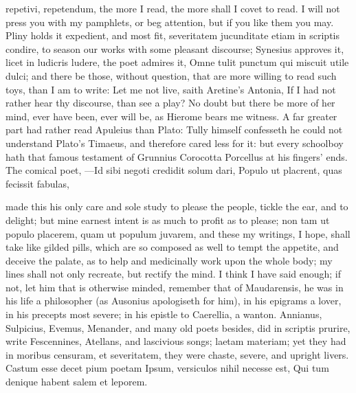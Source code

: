 {repetivi, repetendum, the more I read, the more shall I covet to read.
I will not press you with my pamphlets, or beg attention, but if you
like them you may. Pliny holds it expedient, and most fit, severitatem
jucunditate etiam in scriptis condire, to season our works with some
pleasant discourse; Synesius approves it, licet in ludicris ludere, the
poet admires it, Omne tulit punctum qui miscuit utile dulci; and
there be those, without question, that are more willing to read such
toys, than I am to write: Let me not live, saith Aretine's
Antonia, If I had not rather hear thy discourse, than see a play?
No doubt but there be more of her mind, ever have been, ever will be,
as Hierome bears me witness. A far greater part had rather read
Apuleius than Plato: Tully himself confesseth he could not understand
Plato's Timaeus, and therefore cared less for it: but every schoolboy
hath that famous testament of Grunnius Corocotta Porcellus at his
fingers' ends. The comical poet,
---Id sibi negoti credidit solum dari,
Populo ut placrent, quas fecissit fabulas,

made this his only care and sole study to please the people, tickle the
ear, and to delight; but mine earnest intent is as much to profit as to
please; non tam ut populo placerem, quam ut populum juvarem, and these
my writings, I hope, shall take like gilded pills, which are so
composed as well to tempt the appetite, and deceive the palate, as to
help and medicinally work upon the whole body; my lines shall not only
recreate, but rectify the mind. I think I have said enough; if not, let
him that is otherwise minded, remember that of Maudarensis, he
was in his life a philosopher (as Ausonius apologiseth for him), in his
epigrams a lover, in his precepts most severe; in his epistle to
Caerellia, a wanton. Annianus, Sulpicius, Evemus, Menander, and many
old poets besides, did in scriptis prurire, write Fescennines,
Atellans, and lascivious songs; laetam materiam; yet they had in
moribus censuram, et severitatem, they were chaste, severe, and upright
livers.
Castum esse decet pium poetam
Ipsum, versiculos nihil necesse est,
Qui tum denique habent salem et leporem.

}
